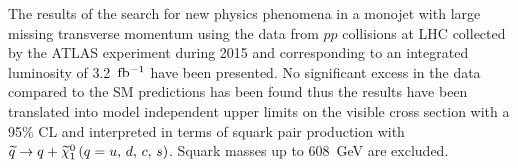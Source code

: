 The results of the search for new physics phenomena in a monojet with large
missing transverse momentum using the data from $pp$ collisions at LHC collected
by the ATLAS experiment during 2015 and corresponding to an integrated
luminosity of 3.2~$\mbox{fb$^{-1}$}$ have been presented. No significant excess in the data
compared to the SM predictions has been found thus the results have been
translated into model independent upper limits on the visible cross section with
a 95\% CL and interpreted in terms of squark pair production with
$\widetilde{q} \rightarrow q + \widetilde{\chi}_1^0\, (q = u,\, d,\, c,\, s)$. Squark masses up to 608~GeV are excluded.
